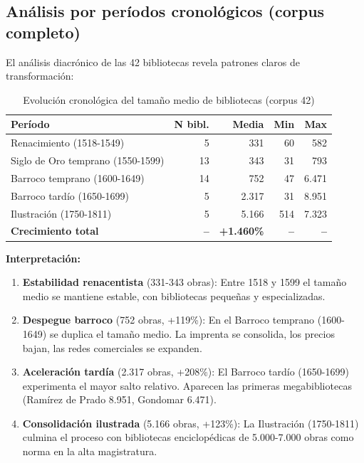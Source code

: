 \documentclass[12pt,a4paper]{article}
\begin{document}
\subsection{Análisis por períodos cronológicos (corpus completo)}

El análisis diacrónico de las 42 bibliotecas revela patrones claros de transformación:

\begin{table}[h]
\centering
\begin{tabular}{lrrrr}
\toprule
\textbf{Período} & \textbf{N bibl.} & \textbf{Media} & \textbf{Min} & \textbf{Max} \\
\midrule
Renacimiento (1518-1549) & 5 & 331 & 60 & 582 \\
Siglo de Oro temprano (1550-1599) & 13 & 343 & 31 & 793 \\
Barroco temprano (1600-1649) & 14 & 752 & 47 & 6.471 \\
Barroco tardío (1650-1699) & 5 & 2.317 & 31 & 8.951 \\
Ilustración (1750-1811) & 5 & 5.166 & 514 & 7.323 \\
\midrule
\textbf{Crecimiento total} & \textbf{--} & \textbf{+1.460\%} & \textbf{--} & \textbf{--} \\
\bottomrule
\end{tabular}
\caption{Evolución cronológica del tamaño medio de bibliotecas (corpus 42)}
\end{table}

\textbf{Interpretación:}

\begin{enumerate}
\item \textbf{Estabilidad renacentista} (331-343 obras): Entre 1518 y 1599 el tamaño medio se mantiene estable, con bibliotecas pequeñas y especializadas.

\item \textbf{Despegue barroco} (752 obras, +119\%): En el Barroco temprano (1600-1649) se duplica el tamaño medio. La imprenta se consolida, los precios bajan, las redes comerciales se expanden.

\item \textbf{Aceleración tardía} (2.317 obras, +208\%): El Barroco tardío (1650-1699) experimenta el mayor salto relativo. Aparecen las primeras megabibliotecas (Ramírez de Prado 8.951, Gondomar 6.471).

\item \textbf{Consolidación ilustrada} (5.166 obras, +123\%): La Ilustración (1750-1811) culmina el proceso con bibliotecas enciclopédicas de 5.000-7.000 obras como norma en la alta magistratura.
\end{enumerate}
\end{document}

